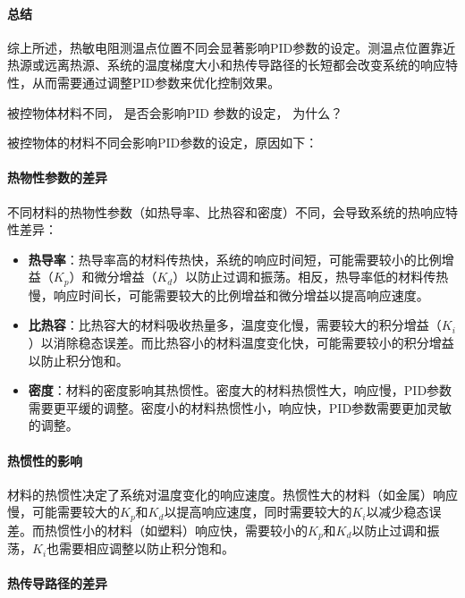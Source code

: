 \documentclass[dvipsnames, svgnames,a4paper,11pt]{article}
\begin{document}
\paragraph*{总结}

综上所述，热敏电阻测温点位置不同会显著影响PID参数的设定。测温点位置靠近热源或远离热源、系统的温度梯度大小和热传导路径的长短都会改变系统的响应特性，从而需要通过调整PID参数来优化控制效果。




\begin{question}
	被控物体材料不同， 是否会影响PID 参数的设定， 为什么？
\end{question}



被控物体的材料不同会影响PID参数的设定，原因如下：

\paragraph*{热物性参数的差异}

不同材料的热物性参数（如热导率、比热容和密度）不同，会导致系统的热响应特性差异：

\begin{itemize}
    \item \textbf{热导率}：热导率高的材料传热快，系统的响应时间短，可能需要较小的比例增益（$K_p$）和微分增益（$K_d$）以防止过调和振荡。相反，热导率低的材料传热慢，响应时间长，可能需要较大的比例增益和微分增益以提高响应速度。
    \item \textbf{比热容}：比热容大的材料吸收热量多，温度变化慢，需要较大的积分增益（$K_i$）以消除稳态误差。而比热容小的材料温度变化快，可能需要较小的积分增益以防止积分饱和。
    \item \textbf{密度}：材料的密度影响其热惯性。密度大的材料热惯性大，响应慢，PID参数需要更平缓的调整。密度小的材料热惯性小，响应快，PID参数需要更加灵敏的调整。
\end{itemize}

\paragraph*{热惯性的影响}

材料的热惯性决定了系统对温度变化的响应速度。热惯性大的材料（如金属）响应慢，可能需要较大的$K_p$和$K_d$以提高响应速度，同时需要较大的$K_i$以减少稳态误差。而热惯性小的材料（如塑料）响应快，需要较小的$K_p$和$K_d$以防止过调和振荡，$K_i$也需要相应调整以防止积分饱和。

\paragraph*{热传导路径的差异}
\end{document}
